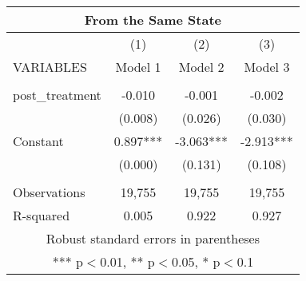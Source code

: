 \begin{tabular}{lccc}
\multicolumn{4}{c}{From the Same State} \\ \hline
 & (1) & (2) & (3) \\
VARIABLES & Model 1 & Model 2 & Model 3 \\ \hline
 &  &  &  \\
post\_treatment & -0.010 & -0.001 & -0.002 \\
 & (0.008) & (0.026) & (0.030) \\
Constant & 0.897*** & -3.063*** & -2.913*** \\
 & (0.000) & (0.131) & (0.108) \\
 &  &  &  \\
Observations & 19,755 & 19,755 & 19,755 \\
 R-squared & 0.005 & 0.922 & 0.927 \\ \hline
\multicolumn{4}{c}{ Robust standard errors in parentheses} \\
\multicolumn{4}{c}{ *** p$<$0.01, ** p$<$0.05, * p$<$0.1} \\
\end{tabular}
